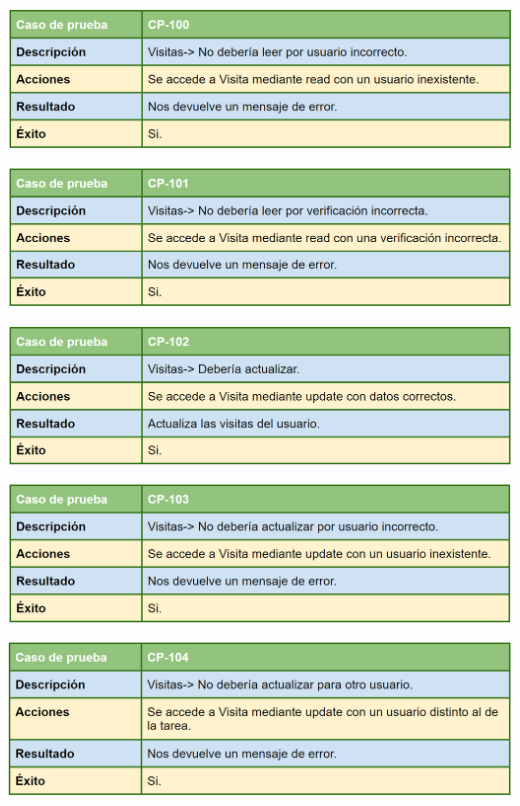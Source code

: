 \bigskip

\includegraphics[width=\textwidth]{img/cap7/cp-100.png}

\bigskip

\includegraphics[width=\textwidth]{img/cap7/cp-101.png}

\bigskip

\includegraphics[width=\textwidth]{img/cap7/cp-102.png}

\bigskip

\includegraphics[width=\textwidth]{img/cap7/cp-103.png}

\bigskip

\includegraphics[width=\textwidth]{img/cap7/cp-104.png}

